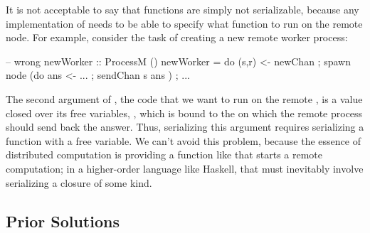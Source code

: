\documentclass[preprint]{sigplanconf}
\newcommand\je[1]{\nb{jeff}{#1}}
\begin{document}
It is not acceptable to say that functions are simply not
serializable, because any implementation of  needs to be able to specify what function to run on the remote node.
For example, consider the task of creating a new remote worker process:
\needspace{7ex}
\begin{code}
  -- wrong
  newWorker :: ProcessM ()
  newWorker = do { (s,r) <- newChan
          			 ; spawn node (do { ans <- ...
                           			  ; sendChan s ans })
          			 ; ... }
\end{code}
The second argument of , the code that we want to run on the remote , is a value closed over
its free variables, , which is bound to the  on which
the remote process should send back the answer.
Thus, serializing this argument requires serializing a function with a free variable.
We can't avoid this problem, because the essence of distributed computation is providing a function like  that starts a remote computation; in a higher-order language like Haskell, that must inevitably
involve serializing a closure of some kind.

\subsection{Prior Solutions}
\end{document}
